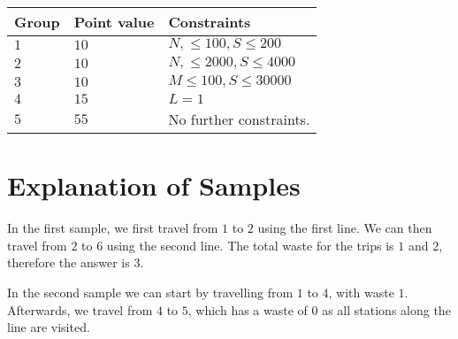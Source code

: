\noindent
\begin{tabular}{| l | l | p{12cm} |}
  \hline
  \textbf{Group} & \textbf{Point value} & \textbf{Constraints} \\ \hline
  $1$    & $10$        &  $N,\le 100, S \le 200$ \\ \hline
  $2$    & $10$        &  $N,\le 2000, S \le 4000$ \\ \hline
  $3$    & $10$        &  $M \le 100, S \le 30000$ \\ \hline
  $4$    & $15$        &  $L=1$ \\ \hline 
  $5$    & $55$        &  No further constraints. \\ \hline
\end{tabular}


\section*{Explanation of Samples}
In the first sample, we first travel from $1$ to $2$ using the first line. We can then travel from
$2$ to $6$ using the second line. The total waste for the trips is $1$ and $2$, therefore the answer is $3$.

In the second sample we can start by travelling from $1$ to $4$, with waste $1$. Afterwards, we travel from
$4$ to $5$, which has a waste of $0$ as all stations along the line are visited.
